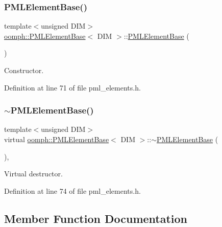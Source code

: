 \subsubsection{\texorpdfstring{P\+M\+L\+Element\+Base()}{PMLElementBase()}}
{\footnotesize\ttfamily template$<$unsigned D\+IM$>$ \\
\hyperlink{classoomph_1_1PMLElementBase}{oomph\+::\+P\+M\+L\+Element\+Base}$<$ D\+IM $>$\+::\hyperlink{classoomph_1_1PMLElementBase}{P\+M\+L\+Element\+Base} (\begin{DoxyParamCaption}{ }\end{DoxyParamCaption})\hspace{0.3cm}{\ttfamily [inline]}}



Constructor. 



Definition at line 71 of file pml\+\_\+elements.\+h.

\mbox{\label{classoomph_1_1PMLElementBase_a2a9399aa63600f5276e865dde49f164a}} 
\subsubsection{\texorpdfstring{$\sim$\+P\+M\+L\+Element\+Base()}{~PMLElementBase()}}
{\footnotesize\ttfamily template$<$unsigned D\+IM$>$ \\
virtual \hyperlink{classoomph_1_1PMLElementBase}{oomph\+::\+P\+M\+L\+Element\+Base}$<$ D\+IM $>$\+::$\sim$\hyperlink{classoomph_1_1PMLElementBase}{P\+M\+L\+Element\+Base} (\begin{DoxyParamCaption}{ }\end{DoxyParamCaption})\hspace{0.3cm}{\ttfamily [inline]}, {\ttfamily [virtual]}}



Virtual destructor. 



Definition at line 74 of file pml\+\_\+elements.\+h.



\subsection{Member Function Documentation}
\mbox{\label{classoomph_1_1PMLElementBase_a6ce32a5723dadf4c7274ffcaf6f2f646}} 
